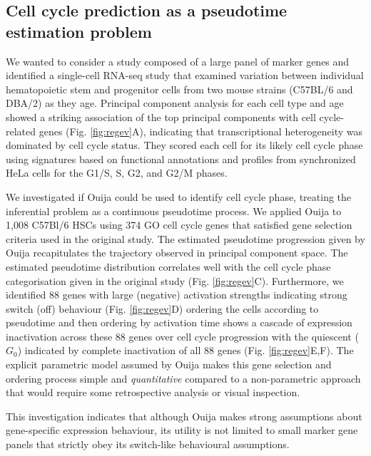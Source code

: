 \subsection{Cell cycle prediction as a pseudotime estimation problem}

We wanted to consider a study composed of a large panel of marker genes and identified a single-cell RNA-seq study \cite{kowalczyk2015single} that examined variation between individual hematopoietic stem and progenitor cells from two mouse strains (C57BL/6 and DBA/2) as they age. Principal component analysis for each cell type and age showed a striking association of the top principal components with cell cycle-related genes (Fig. \ref{fig:regev}A), indicating that transcriptional heterogeneity was dominated by cell cycle status. They scored each cell for its likely cell cycle phase using signatures based on functional annotations \cite{reference2009gene} and profiles from synchronized HeLa cells\cite{whitfield2002identification} for the G1/S, S, G2, and G2/M phases.

We investigated if Ouija could be used to identify cell cycle phase, treating the inferential problem as a continuous pseudotime process. We applied Ouija to 1,008 C57Bl/6 HSCs using 374 GO cell cycle genes that satisfied gene selection criteria used in the original study. The estimated pseudotime progression given by Ouija recapitulates the  trajectory observed in principal component space. The estimated pseudotime distribution correlates well with the cell cycle phase categorisation  given in the original study (Fig. \ref{fig:regev}C). Furthermore, we identified 88 genes with large (negative) activation strengths indicating strong switch (off) behaviour (Fig. \ref{fig:regev}D) ordering the cells according to pseudotime and then ordering by activation time shows a cascade of expression inactivation across these 88 genes over cell cycle progression with the quiescent ($G_0$) indicated by complete inactivation of all 88 genes (Fig. \ref{fig:regev}E,F). The explicit parametric model assumed by Ouija makes this gene selection and ordering process simple and \emph{quantitative} compared to a non-parametric approach that would require some retrospective analysis or visual inspection.

This investigation indicates that although Ouija makes strong assumptions about gene-specific expression behaviour, its utility is not limited to small marker gene panels that strictly obey its switch-like behavioural assumptions.

